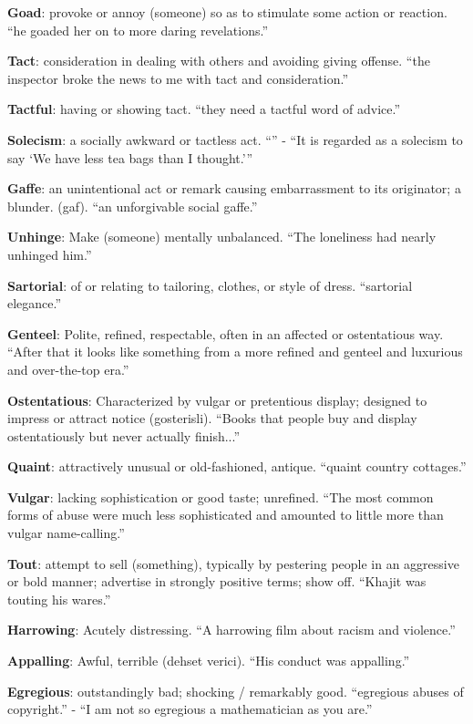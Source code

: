 \documentclass[12pt, a4paper]{ximera}
\begin{document}
\textbf{Goad}: provoke or annoy (someone) so as to stimulate some action or reaction. ``he goaded her on to more daring revelations.''

\textbf{Tact}: consideration in dealing with others and avoiding giving offense. ``the inspector broke the news to me with tact and consideration.''

\textbf{Tactful}: having or showing tact. ``they need a tactful word of advice.''

\textbf{Solecism}: a socially awkward or tactless act. ``'' - ``It is regarded as a solecism to say ‘We have less tea bags than I thought.’''

\textbf{Gaffe}: an unintentional act or remark causing embarrassment to its originator; a blunder. (gaf). ``an unforgivable social gaffe.''

\textbf{Unhinge}: Make (someone) mentally unbalanced. ``The loneliness had nearly unhinged him.''

\textbf{Sartorial}: of or relating to tailoring, clothes, or style of dress. ``sartorial elegance.''

\textbf{Genteel}: Polite, refined, respectable, often in an affected or ostentatious way. ``After that it looks like something from a more refined and genteel and luxurious and over-the-top era.''

\textbf{Ostentatious}: Characterized by vulgar or pretentious display; designed to impress or attract notice (gosterisli). ``Books that people buy and display ostentatiously but never actually finish...''

\textbf{Quaint}: attractively unusual or old-fashioned, antique. ``quaint country cottages.''

\textbf{Vulgar}: lacking sophistication or good taste; unrefined. ``The most common forms of abuse were much less sophisticated and amounted to little more than vulgar name-calling.''

\textbf{Tout}: attempt to sell (something), typically by pestering people in an aggressive or bold manner; advertise in strongly positive terms; show off. ``Khajit was touting his wares.''

\textbf{Harrowing}: Acutely distressing. ``A harrowing film about racism and violence.''

\textbf{Appalling}: Awful, terrible (dehset verici). ``His conduct was appalling.''

\textbf{Egregious}: outstandingly bad; shocking / remarkably good. ``egregious abuses of copyright.'' - ``I am not so egregious a mathematician as you are.''
\end{document}

